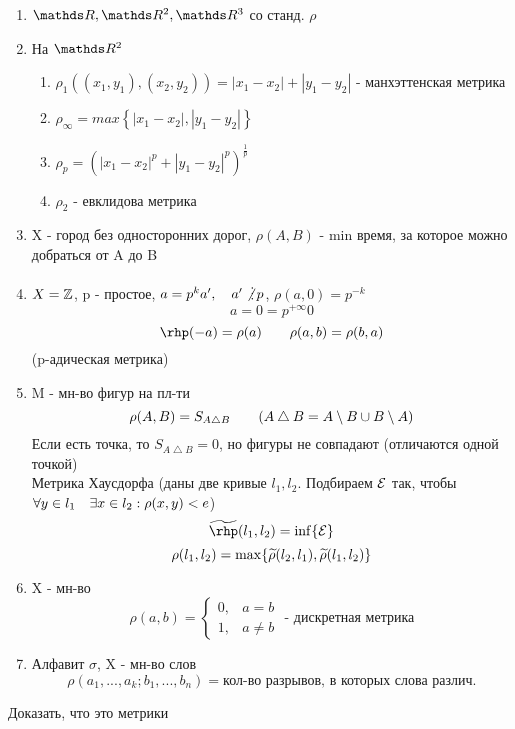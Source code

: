 \documentclass[geometry.tex]{subfiles}
\begin{document}
  \begin{examples}
      \begin{enumerate}
          \item $\R, \R^2, \R^3$ со станд. $\rho$
          \item На $\R^2$
          \begin{enumerate}
              \item $\rho_1((x_1, y_1), (x_2, y_2)) = |x_1 - x_2| + |y_1 - y_2|$ - манхэттенская метрика
              \item $\rho_\infty = max\left\{|x_1 - x_2|, |y_1 - y_2|\right\}$
              \item $\rho_p = (|x_1 - x_2|^p + |y_1 - y_2|^p)^{\frac{1}{p}}$
              \item $\rho_2 \text{ - евклидова метрика}$
          \end{enumerate}
          \item X - город без односторонних дорог, $\rho(A, B)$ - min время, за которое можно добраться от A до B
          \item $X = \mathbb{Z}$, p - простое, $a = p^k a', \q a' \not \devides p$, $\rho(a, 0) = p^{-k}$
          \[a = 0 = p^{+\infty} 0\]
          \[\rhp(-a) = \rho(a) \qq \rho(a,b) = \rho(b,a)\]
          (p-адическая метрика)
          \item M - мн-во фигур на пл-ти
          \[\rho(A, B) = S_{A \bigtriangleup B} \qquad (A \bigtriangleup B = A\setminus B \cup B \setminus A)\]
          Если есть точка, то $S_{A \bigtriangleup B} = 0$, но фигуры не совпадают (отличаются одной точкой)\\
          Метрика Хаусдорфа (даны две кривые $l_1, l_2$. Подбираем $\mathcal{E}$ так, чтобы $\forall y \in l_1 \quad \exists x \in l_2: \rho(x,y)< e$)
          \[\w{\rhp}(l_1, l_2) = \inf\{\E\}\]
          \[\rho(l_1, l_2) = \max\{\widetilde{\rho}(l_2,l_1), \widetilde{\rho}(l_1,l_2)\}\]
          \item X - мн-во\\
              \[\rho(a, b) =
              \begin{cases}
                  0, &a = b\\
                  1, &a \neq b
              \end{cases}\text{ - дискретная метрика}\]
          \item Алфавит $\sigma$, X - мн-во слов
          \[\rho(a_1,...,a_k;b_1,...,b_n) = \text{кол-во разрывов, в которых слова различ.}\]
      \end{enumerate}
  \end{examples}

  \begin{upr}
    Доказать, что это метрики
  \end{upr}
\end{document}
